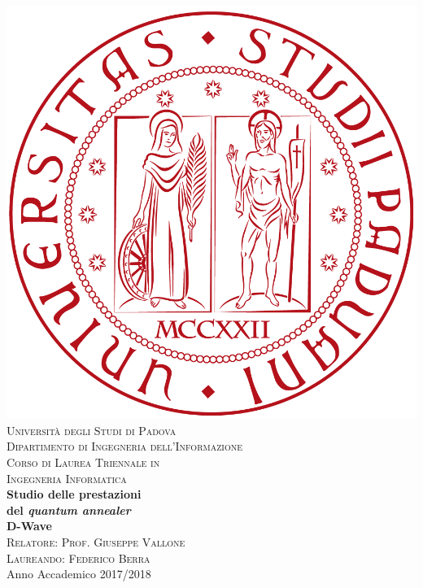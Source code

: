 \begin{titlepage}
\begin{center}
\includegraphics[scale=0.08]{Immagini/logo.png}\\[1.5cm]
\textsc{\LARGE Universit\`{a} degli Studi di Padova}\\[1.2cm]
\textsc{\Large Dipartimento di Ingegneria dell'Informazione}\\[0.8cm]
\textsc{\Large Corso di Laurea Triennale in}\\[0.5cm]
\textsc{\Large Ingegneria Informatica}\\[2cm]
{ \LARGE \bfseries Studio delle prestazioni \\del \textit{quantum annealer}\\ D-Wave}\\[2cm]
\textsc{\large Relatore: Prof. Giuseppe Vallone}\\[0.5cm]
\textsc{\large Laureando: Federico Berra}\\
\vfill
{\large Anno Accademico 2017/2018}
\end{center}
\end{titlepage}
